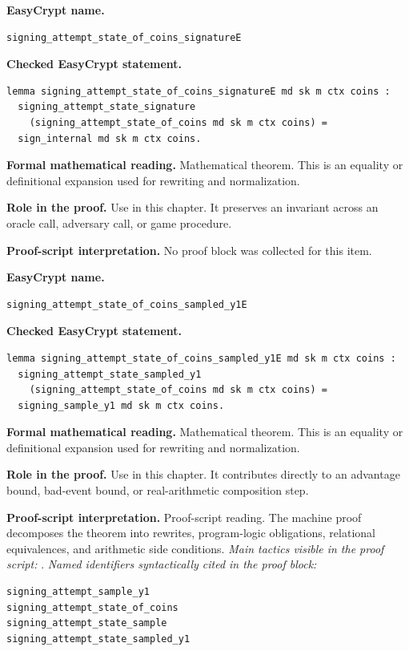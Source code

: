 \begin{formaltheorem}
\noindent\textbf{EasyCrypt name.}
\begin{lstlisting}[language=EasyCrypt,basicstyle=\ttfamily\scriptsize]
signing_attempt_state_of_coins_signatureE
\end{lstlisting}
\noindent\textbf{Checked EasyCrypt statement.}
\begin{lstlisting}[language=EasyCrypt,basicstyle=\ttfamily\scriptsize]
lemma signing_attempt_state_of_coins_signatureE md sk m ctx coins :
  signing_attempt_state_signature
    (signing_attempt_state_of_coins md sk m ctx coins) =
  sign_internal md sk m ctx coins.
\end{lstlisting}
\noindent\textbf{Formal mathematical reading.}
Mathematical theorem. This is an equality or definitional expansion used for rewriting and normalization.

\noindent\textbf{Role in the proof.}
Use in this chapter. It preserves an invariant across an oracle call, adversary call, or game procedure.

\noindent\textbf{Proof-script interpretation.}
No proof block was collected for this item.

\end{formaltheorem}

\begin{formaltheorem}
\noindent\textbf{EasyCrypt name.}
\begin{lstlisting}[language=EasyCrypt,basicstyle=\ttfamily\scriptsize]
signing_attempt_state_of_coins_sampled_y1E
\end{lstlisting}
\noindent\textbf{Checked EasyCrypt statement.}
\begin{lstlisting}[language=EasyCrypt,basicstyle=\ttfamily\scriptsize]
lemma signing_attempt_state_of_coins_sampled_y1E md sk m ctx coins :
  signing_attempt_state_sampled_y1
    (signing_attempt_state_of_coins md sk m ctx coins) =
  signing_sample_y1 md sk m ctx coins.
\end{lstlisting}
\noindent\textbf{Formal mathematical reading.}
Mathematical theorem. This is an equality or definitional expansion used for rewriting and normalization.

\noindent\textbf{Role in the proof.}
Use in this chapter. It contributes directly to an advantage bound, bad-event bound, or real-arithmetic composition step.

\noindent\textbf{Proof-script interpretation.}
Proof-script reading. The machine proof decomposes the theorem into rewrites, program-logic obligations, relational equivalences, and arithmetic side conditions.
\emph{Main tactics visible in the proof script:} .
\emph{Named identifiers syntactically cited in the proof block:}
\begin{lstlisting}[language=EasyCrypt,basicstyle=\ttfamily\scriptsize]
signing_attempt_sample_y1
signing_attempt_state_of_coins
signing_attempt_state_sample
signing_attempt_state_sampled_y1
\end{lstlisting}

\end{formaltheorem}

